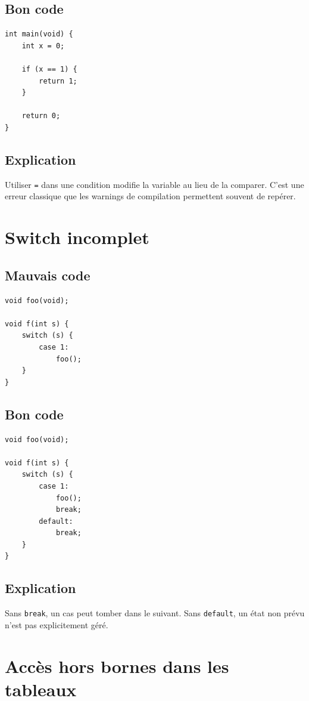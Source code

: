 \documentclass[a4paper,11pt]{report}
\begin{document}
\section{Bon code}
\begin{lstlisting}
int main(void) {
    int x = 0;

    if (x == 1) {
        return 1;
    }

    return 0;
}
\end{lstlisting}

\section{Explication}
Utiliser \texttt{=} dans une condition modifie la variable au lieu de la comparer.
C'est une erreur classique que les warnings de compilation permettent souvent de repérer.

\chapter{Switch incomplet}

\section{Mauvais code}
\begin{lstlisting}
void foo(void);

void f(int s) {
    switch (s) {
        case 1:
            foo();
    }
}
\end{lstlisting}

\section{Bon code}
\begin{lstlisting}
void foo(void);

void f(int s) {
    switch (s) {
        case 1:
            foo();
            break;
        default:
            break;
    }
}
\end{lstlisting}

\section{Explication}
Sans \texttt{break}, un cas peut tomber dans le suivant.
Sans \texttt{default}, un état non prévu n'est pas explicitement géré.

\chapter{Accès hors bornes dans les tableaux}
\end{document}

